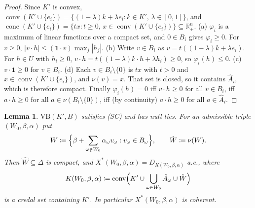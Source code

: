 \documentclass[11pt]{article}
\newcommand{\R}{\mathbb{R}}
\newcommand{\one}{\mathbf{1}}
\newcommand{\VB}{\mathrm{VB}}
\DeclareMathOperator{\conv}{conv}
\DeclareMathOperator{\cone}{cone}
\theoremstyle{plain}
\newtheorem{lemma}[theorem]{Lemma}
\theoremstyle{definition}
\theoremstyle{remark}
\begin{document}
\begin{proof}
Since $K'$ is convex, $\conv(K'\cup\{e_i\})=\{(1-\lambda)k+\lambda e_i:k\in K',\,
\lambda\in[0,1]\}$, and $\cone(K'\cup\{e_i\})=\{tx:t\ge0,\,x\in\conv(K'\cup\{e_i\})\}
\subseteq\R^n_+$.
(a) $\varphi_i$ is a maximum of linear functions over a compact set, and $0\in B_i$ gives
$\varphi_i\ge0$. For $v\ge0$, $|v\cdot h|\le(\one\cdot v)\max_j|h_j|$.
(b) Write $v\in B_i$ as $v=t((1-\lambda)k+\lambda e_i)$. For $h\in U$ with $h_i\ge0$,
$v\cdot h=t((1-\lambda)k\cdot h+\lambda h_i)\ge0$, so $\varphi_i(h)\le0$.
(c) $v\cdot\one\ge0$ for $v\in B_i$.
(d) Each $v\in B_i\setminus\{0\}$ is $tx$ with $t>0$ and $x\in\conv(K'\cup\{e_i\})$, and
$\nu(v)=x$. That set is closed, so it contains $\hat A_i$, which is therefore compact.
Finally $\varphi_i(h)=0$ iff $v\cdot h\ge0$ for all $v\in B_i$, iff $a\cdot h\ge0$ for all
$a\in\nu(B_i\setminus\{0\})$, iff (by continuity) $a\cdot h\ge0$ for all $a\in\hat A_i$.
\end{proof}

\begin{lemma}\label{lem:coh}
$\VB(K',B)$ satisfies (SC) and has null ties. For an admissible triple $(W_0,\beta,\alpha)$
put
\[
  W\coloneqq\Bigl\{\beta+\sum_{\omega\notin W_0}\alpha_\omega v_\omega:v_\omega\in
  B_\omega\Bigr\},\qquad\hat W\coloneqq\nu(W).
\]
Then $\hat W\subseteq\Delta$ is compact, and $X^\ast(W_0,\beta,\alpha)=D_{K(W_0,\beta,
\alpha)}$ a.e., where
\[
  K(W_0,\beta,\alpha)\coloneqq\conv\Bigl(K'\cup\bigcup_{\omega\in W_0}\hat A_\omega\cup
  \hat W\Bigr)
\]
is a credal set containing $K'$. In particular $X^\ast(W_0,\beta,\alpha)$ is coherent.
\end{lemma}
\end{document}
